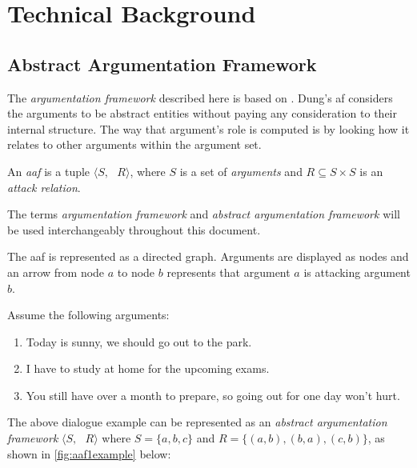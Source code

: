 \section{Technical Background} 
    \subsection{Abstract Argumentation Framework}
        The \textit{argumentation framework} described here is based on \autocite{Dung1995OnTA}. Dung's \gls{af} considers the arguments to be abstract entities without paying any consideration to their internal structure. The way that argument's role is computed is by looking how it relates to other arguments within the argument set.
        
        \begin{definition}
            An \textit{\gls{aaf}} is a tuple $\langle S, \text{ }R \rangle$, where $S$ is a set of \textit{arguments} and $R \subseteq S \times S$ is an \textit{attack relation}.
            \label{definition:definition1}
        \end{definition}
        
        \begin{remark}
            The terms \textit{argumentation framework} and \textit{abstract argumentation framework} will be used interchangeably throughout this document.
            \label{remark:remark1}
        \end{remark}
        
        The \gls{aaf} is represented as a directed graph. Arguments are displayed as nodes and an arrow from node $a$ to node $b$ represents that argument $a$ is attacking argument $b$.
        \begin{exa}
            Assume the following arguments:
            \begin{enumerate}[label=\alph* -]
                \item Today is sunny, we should go out to the park.
                \item I have to study at home for the upcoming exams.
                \item You still have over a month to prepare, so going out for one day won't hurt.
            \end{enumerate}
            \label{exa:example1}
        \end{exa}
        
        The above dialogue example can be represented as an \textit{abstract argumentation framework} $\langle S, \text{ }R \rangle$ where $S = \{a, b, c\}$ and $R = \{(a, b), (b, a), (c, b)\}$, as shown in \autoref{fig:aaf1example} below:
        
        
